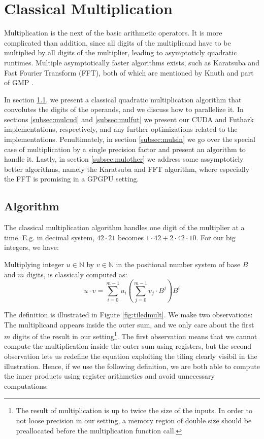 \section{Classical Multiplication}
\label{sec:mul}

Multiplication is the next of the basic arithmetic operators. It is more
complicated than addition, since all digits of the multiplicand have to be
multiplied by all digits of the multiplier, leading to asymptoticly quadratic
runtimes. Multiple asymptotically faster algorithms exists, such as Karatsuba
and Fast Fourier Transform (FFT), both of which are mentioned by Knuth and part
of GMP \cite{knuth97} \cite{GMP}.

In section \ref{subsec:mulalg}, we present a classical quadratic multiplication
algorithm that convolutes the digits of the operands, and we discuss how to
parallelize it. In sections \ref{subsec:mulcud} and \ref{subsec:mulfut} we
present our CUDA and Futhark implementations, respectively, and any further
optimizations related to the implementations. Penultimately, in section
\ref{subsec:mulsin} we go over the special case of multiplication by a single
precision factor and present an algorithm to handle it. Lastly, in section
\ref{subsec:mulother} we address some assymptoticly better algorithms, namely
the Karatsuba and FFT algorithm, where especially the FFT is promising in a
GPGPU setting.

\subsection{Algorithm}
\label{subsec:mulalg}

The classical multiplication algorithm handles one digit of the multiplier at a
time. E.g. in decimal system, $42\cdot 21$ becomes
$1 \cdot 42 + 2 \cdot 42 \cdot 10$. For our big integers, we have:

\begin{definition}\label{def:clasmul}
  Multiplying integer $u\in \mathbb{N}$ by $v \in \mathbb{N}$ in the positional number system of base
  $B$ and $m$ digits, is classicaly computed as:
\begin{equation}
  \label{eq:clasmul0}
  u \cdot v = \sum_{i=0}^{m-1}u_i\left( \sum_{j=0}^{m-1}v_j\cdot B^{j} \right)B^{i}
\end{equation}
\end{definition}

The definition is illustrated in Figure \ref{fig:tiledmult}. We make two
observations: The multiplicand appears inside the outer sum, and we only care
about the first $m$ digits of the result in our setting\footnote{The result of
  multiplication is up to twice the size of the inputs. In order to not loose
  precision in our setting, a memory region of double size should be
  preallocated before the multiplication function call.}. The first observation
means that we cannot compute the multiplication inside the outer sum using
registers, but the second observation lets us redefine the equation exploiting
the tiling clearly visibil in the illustration. Hence, if we use the following
definition, we are both able to compute the inner products using register
arithmetics and avoid unnecessary computations:

